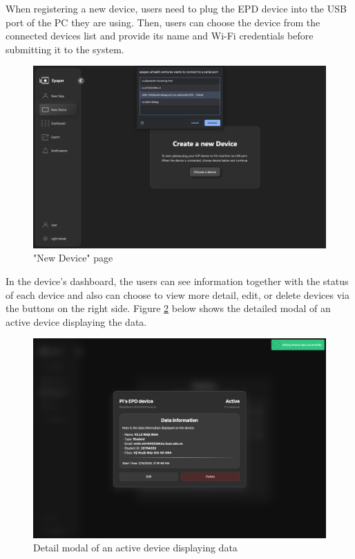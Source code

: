\documentclass[../Main.tex]{subfiles}
\begin{document}
When registering a new device, users need to plug the \gls{EPD} device into the USB port of the PC they are using. Then, users can choose the device from the connected devices list and provide its name and Wi-Fi credentials before submitting it to the system.

\begin{figure}[H]
    \centering
    \includegraphics[width=0.87\linewidth]{doc//imgs/ui_new-device.png}
    \caption{"New Device" page}
    \label{fig:ui_new-device}
\end{figure}

In the device's dashboard, the users can see information together with the status of each device and also can choose to view more detail, edit, or delete devices via the buttons on the right side. Figure \ref{fig:detail-modal} below shows the detailed modal of an active device displaying the data. 

\begin{figure}[H]
    \centering
    \includegraphics[width=0.85\linewidth]{doc//imgs/ui_device-modal.png}
    \caption{Detail modal of an active device displaying data}
    \label{fig:detail-modal}
\end{figure}
\end{document}
